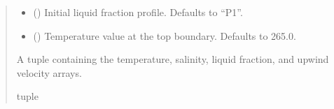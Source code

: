 \documentclass[a4paper,11pt,english,openany]{sphinxmanual}
\begin{document}
\begin{fulllineitems}
\begin{quote}
\begin{description}
\begin{itemize}
\item {} 
\sphinxAtStartPar
{} (\sphinxstyleliteralemphasis{\sphinxupquote{, }}) \textendash{} Initial liquid fraction profile. Defaults to “P1”.

\item {} 
\sphinxAtStartPar
{} (\sphinxstyleliteralemphasis{\sphinxupquote{, }}) \textendash{} Temperature value at the top boundary. Defaults to 265.0.

\end{itemize}

\sphinxAtStartPar
A tuple containing the temperature, salinity, liquid fraction, and upwind velocity arrays.

\sphinxAtStartPar
tuple

\end{description}\end{quote}

\end{fulllineitems}

\end{document}
